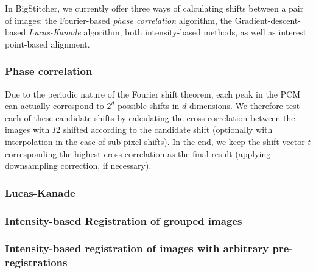 In BigStitcher, we currently offer three ways of calculating shifts between a pair of images: the Fourier-based \emph{phase correlation} algorithm, the Gradient-descent-based \emph{Lucas-Kanade} algorithm, both intensity-based methods, as well as interest point-based alignment.

\subsubsection{Phase correlation}

Due to the periodic nature of the Fourier shift theorem, each peak in the PCM can actually correspond to $2^d$ possible shifts in $d$ dimensions. We therefore test each of these candidate shifts by calculating the cross-correlation between the images with $I2$ shifted according to the candidate shift (optionally with interpolation in the case of sub-pixel shifts). In the end, we keep the shift vector $t$ corresponding the highest cross correlation as the final result (applying downsampling correction, if necessary).

\subsubsection{Lucas-Kanade}

\subsubsection{Intensity-based Registration of grouped images}

\subsubsection{Intensity-based registration of images with arbitrary pre-registrations}

